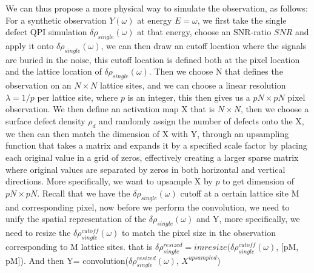 We can thus propose a more physical way to simulate the observation, as follows: 
For a synthetic observation $Y(\omega)$ at energy $E=\omega$, we first take the single defect QPI simulation $\delta\rho_{single} (\omega)$ at that energy, choose an SNR-ratio $SNR$ and apply it onto $\delta\rho_{single} (\omega)$, we can then draw an cutoff location where the signals are buried in the noise, this cutoff location is defined both at the pixel location and the lattice location of $\delta\rho_{single} (\omega)$. Then we choose N that defines the observation on an $N\times N$ lattice sites, and we can choose a linear resolution $\lambda = 1/p$ per lattice site, where $p$ is an integer, this then gives us a $pN \times pN$ pixel observation.
We then define an activation map X that is $N\times N$, then we choose a surface defect density $\rho_d$ and randomly assign the number of defects onto the X, we then can then match the dimension of X with Y, through an upsampling function that takes a matrix and expands it by a specified scale factor by placing each original value in a grid of zeros, effectively creating a larger sparse matrix where original values are separated by zeros in both horizontal and vertical directions. More specifically, we want to upsample X by $p$ to get dimension of $pN \times pN$. 
Recall that we have the $\delta\rho_{single} (\omega)$ cutoff at a certain lattice site M and corresponding pixel, now before we perform the convolution, we need to unify the spatial representation of the $\delta\rho_{single} (\omega)$ and Y, more specifically, we need to resize the $\delta\rho^{cutoff}_{single} (\omega)$ to match the pixel size in the observation corresponding to M lattice sites. that is $\delta\rho^{resized}_{single}= imresize(\delta\rho^{cutoff}_{single} (\omega)$, [pM, pM]). And then Y= convolution($\delta\rho^{resized}_{single} (\omega)$, $X^{upsampled}$)

